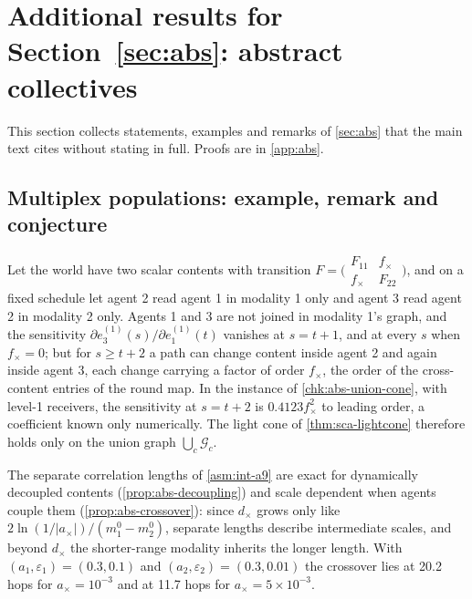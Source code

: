 \section{Additional results for \texorpdfstring{Section~\ref{sec:abs}}{Section 10}: abstract collectives}\label{sup:abs}

This section collects statements, examples and remarks of \cref{sec:abs} that the main text cites without stating in full. Proofs are in \cref{app:abs}.

\subsection{Multiplex populations: example, remark and conjecture}\label{sup:abs-multiplex-populations-example-remark-and}

\begin{example}\label{ex:abs-union-cone}
Let the world have two scalar contents with transition $F=\bigl(\begin{smallmatrix}F_{11}&f_\times\\f_\times&F_{22}\end{smallmatrix}\bigr)$, and on a fixed schedule let agent 2 read agent 1 in modality 1 only and agent 3 read agent 2 in modality 2 only. Agents 1 and 3 are not joined in modality 1's graph, and the sensitivity $\partial e^{(1)}_3(s)/\partial e^{(1)}_1(t)$ vanishes at $s=t+1$, and at every $s$ when $f_\times=0$; but for $s\ge t+2$ a path can change content inside agent 2 and again inside agent 3, each change carrying a factor of order $f_\times$, the order of the cross-content entries of the round map. In the instance of \cref{chk:abs-union-cone}, with level-1 receivers, the sensitivity at $s=t+2$ is $0.4123f_\times^2$ to leading order, a coefficient known only numerically. The light cone of \cref{thm:sca-lightcone} therefore holds only on the union graph $\bigcup_c\mathcal G_c$.
\end{example}

\begin{remark}\label{rem:abs-multiplex}
The separate correlation lengths of \cref{asm:int-a9} are exact for dynamically decoupled contents (\cref{prop:abs-decoupling}) and scale dependent when agents couple them (\cref{prop:abs-crossover}): since $d_\times$ grows only like $2\ln(1/\lvert a_\times\rvert)/(m^0_1-m^0_2)$, separate lengths describe intermediate scales, and beyond $d_\times$ the shorter-range modality inherits the longer length. With $(a_1,\varepsilon_1)=(0.3,0.1)$ and $(a_2,\varepsilon_2)=(0.3,0.01)$ the crossover lies at 20.2 hops for $a_\times=10^{-3}$ and at 11.7 hops for $a_\times=5\times10^{-3}$.
\end{remark}

